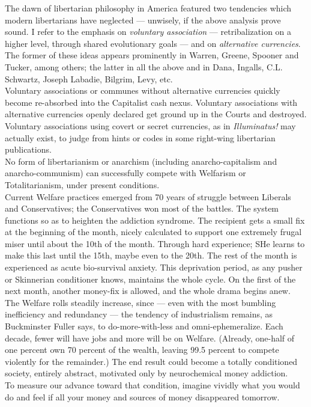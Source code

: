 The dawn of libertarian philosophy in America featured two tendencies which modern libertarians have neglected --- unwisely, if the above analysis prove sound. I refer to the emphasis on \emph{voluntary association} --- retribalization on a higher level, through shared evolutionary goals --- and on \emph{alternative currencies}. The former of these ideas appears prominently in Warren, Greene, Spooner and Tucker, among others; the latter in all the above and in Dana, Ingalls, C.L. Schwartz, Joseph Labadie, Bilgrim, Levy, etc.\\
Voluntary associations or communes without alternative currencies quickly become re-absorbed into the Capitalist cash nexus. Voluntary associations with alternative currencies openly declared get ground up in the Courts and destroyed. Voluntary associations using covert or secret currencies, as in \emph{Illuminatus!} may actually exist, to judge from hints or codes in some right-wing libertarian publications.\\
No form of libertarianism or anarchism (including anarcho-capitalism and anarcho-communism) can successfully compete with Welfarism or Totalitarianism, under present conditions.\\
Current Welfare practices emerged from 70 years of struggle between Liberals and Conservatives; the Conservatives won most of the battles. The system functions so as to heighten the addiction syndrome. The recipient gets a small fix at the beginning of the month, nicely calculated to support one extremely frugal miser until about the 10th of the month. Through hard experience; SHe learns to make this last until the 15th, maybe even to the 20th. The rest of the month is experienced as acute bio-survival anxiety. This deprivation period, as any pusher or Skinnerian conditioner knows, maintains the whole cycle. On the first of the next month, another money-fix is allowed, and the whole drama begins anew.\\
The Welfare rolls steadily increase, since --- even with the most bumbling inefficiency and redundancy --- the tendency of industrialism remains, as Buckminster Fuller says, to do-more-with-less and omni-ephemeralize. Each decade, fewer will have jobs and more will be on Welfare. (Already, one-half of one percent own 70 percent of the wealth, leaving 99.5 percent to compete violently for the remainder.) The end result could become a totally conditioned society, entirely abstract, motivated only by neurochemical money addiction.\\
To measure our advance toward that condition, imagine vividly what you would do and feel if all your money and sources of money disappeared tomorrow.\\
